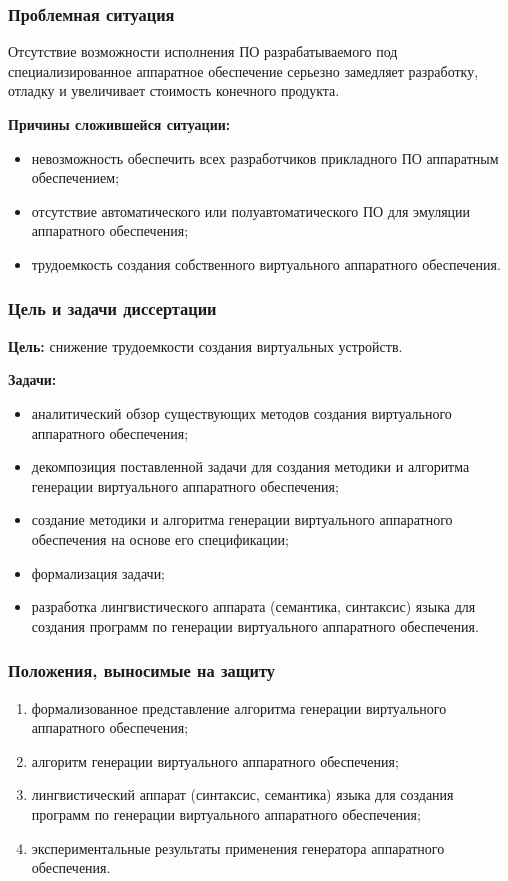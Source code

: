 \begin{frame}%
    \frametitle{Проблемная ситуация}

    Отсутствие возможности исполнения ПО разрабатываемого под специализированное
    аппаратное обеспечение серьезно замедляет разработку, отладку и
    увеличивает стоимость конечного продукта.

    \textbf{Причины сложившейся ситуации:}
    \begin{itemize}
        \item невозможность обеспечить всех разработчиков прикладного ПО аппаратным обеспечением;
        \item отсутствие автоматического или полуавтоматического ПО для эмуляции аппаратного обеспечения;
        \item трудоемкость создания собственного виртуального аппаратного обеспечения.
    \end{itemize}
\end{frame}


\begin{frame}%
    \frametitle{Цель и задачи диссертации}
    \textbf{Цель:} снижение трудоемкости создания виртуальных устройств.

    \textbf{Задачи:}
    \begin{itemize}
        \item аналитический обзор существующих методов создания виртуального аппаратного обеспечения;
        \item декомпозиция поставленной задачи для создания методики и алгоритма генерации виртуального аппаратного обеспечения;
        \item создание методики и алгоритма генерации виртуального аппаратного обеспечения на основе его спецификации;
        \item формализация задачи;
        \item разработка лингвистического аппарата (семантика, синтаксис) языка для создания программ по генерации виртуального
            аппаратного обеспечения.
    \end{itemize}
\end{frame}


\begin{frame}%
    \frametitle{Положения, выносимые на защиту}
    \begin{enumerate}
        \item формализованное представление алгоритма генерации виртуального аппаратного обеспечения;
        \item алгоритм генерации виртуального аппаратного обеспечения;
        \item лингвистический аппарат (синтаксис, семантика) языка для создания программ по генерации виртуального
            аппаратного обеспечения;
        \item экспериментальные результаты применения генератора аппаратного обеспечения.
    \end{enumerate}
\end{frame}


